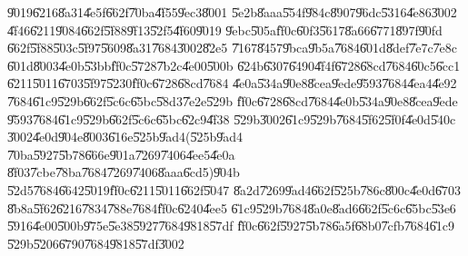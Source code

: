 \documentclass{article}
\begin{document}
\U{9019}\U{6216}\U{8a31}\U{4e5f}\U{662f}\U{70ba}\U{4f55}\U{9ec3}\U{8001}%
\U{5e2b}\U{8aaa}\U{554f}\U{984c}\U{8907}\U{96dc}\U{5316}\U{4e86}\U{3002}%
\U{4f46}\U{6211}\U{9084}\U{662f}\U{5f88}\U{9f13}\U{52f5}\U{4f60}\U{9019}%
\U{9ebc}\U{505a}\U{ff0c}\U{60f3}\U{5617}\U{8a66}\U{6771}\U{897f}\U{90fd}%
\U{662f}\U{5f88}\U{503c}\U{5f97}\U{5609}\U{8a31}\U{7684}\U{3002}\U{82e5}%
\U{7167}\U{8457}\U{9bca}\U{9b5a}\U{7684}\U{601d}\U{8def}\U{7e7c}\U{7e8c}%
\U{601d}\U{8003}\U{4e0b}\U{53bb}\U{ff0c}\U{5728}\U{7b2c}\U{4e00}\U{500b}%
\U{624b}\U{6307}\U{6490}\U{4f4f}\U{6728}\U{68cd}\U{7684}\U{60c5}\U{6cc1}%
\U{6211}\U{5011}\U{6703}\U{5f97}\U{5230}\U{ff0c}\U{6728}\U{68cd}\U{7684}%
\U{4e0a}\U{534a}\U{90e8}\U{8cea}\U{9ede}\U{9593}\U{7684}\U{4ea4}\U{4e92}%
\U{7684}\U{61c9}\U{529b}\U{662f}\U{5c6c}\U{65bc}\U{58d3}\U{7e2e}\U{529b}%
\U{ff0c}\U{6728}\U{68cd}\U{7684}\U{4e0b}\U{534a}\U{90e8}\U{8cea}\U{9ede}%
\U{9593}\U{7684}\U{61c9}\U{529b}\U{662f}\U{5c6c}\U{65bc}\U{62c9}\U{4f38}%
\U{529b}\U{3002}\U{61c9}\U{529b}\U{7684}\U{5f62}\U{5f0f}\U{4e0d}\U{540c}%
\U{3002}\U{4e0d}\U{904e}\U{8003}\U{616e}\U{525b}\U{9ad4}(\U{525b}\U{9ad4}%
\U{70ba}\U{5927}\U{5b78}\U{666e}\U{901a}\U{7269}\U{7406}\U{4ee5}\U{4e0a}%
\U{8f03}\U{7cbe}\U{78ba}\U{7684}\U{7269}\U{7406}\U{8aaa}\U{6cd5})\U{904b}%
\U{52d5}\U{7684}\U{6642}\U{5019}\U{ff0c}\U{6211}\U{5011}\U{662f}\U{5047}%
\U{8a2d}\U{7269}\U{9ad4}\U{662f}\U{525b}\U{786c}\U{800c}\U{4e0d}\U{6703}%
\U{8b8a}\U{5f62}\U{6216}\U{7834}\U{788e}\U{7684}\U{ff0c}\U{6240}\U{4ee5}%
\U{61c9}\U{529b}\U{7684}\U{8a0e}\U{8ad6}\U{662f}\U{5c6c}\U{65bc}\U{53e6}%
\U{5916}\U{4e00}\U{500b}\U{975e}\U{5e38}\U{5927}\U{7684}\U{9818}\U{57df}%
\U{ff0c}\U{662f}\U{5927}\U{5b78}\U{6a5f}\U{68b0}\U{7cfb}\U{7684}\U{61c9}%
\U{529b}\U{5206}\U{6790}\U{7684}\U{9818}\U{57df}\U{3002}

\bigskip 
\end{document}
